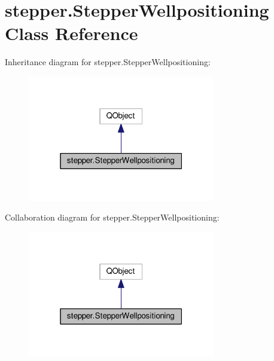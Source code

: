 \hypertarget{classstepper_1_1_stepper_wellpositioning}{}\section{stepper.\+Stepper\+Wellpositioning Class Reference}
\label{classstepper_1_1_stepper_wellpositioning}


Inheritance diagram for stepper.\+Stepper\+Wellpositioning\+:
\nopagebreak
\begin{figure}[H]
\begin{center}
\leavevmode
\includegraphics[width=232pt]{classstepper_1_1_stepper_wellpositioning__inherit__graph}
\end{center}
\end{figure}


Collaboration diagram for stepper.\+Stepper\+Wellpositioning\+:
\nopagebreak
\begin{figure}[H]
\begin{center}
\leavevmode
\includegraphics[width=232pt]{classstepper_1_1_stepper_wellpositioning__coll__graph}
\end{center}
\end{figure}
